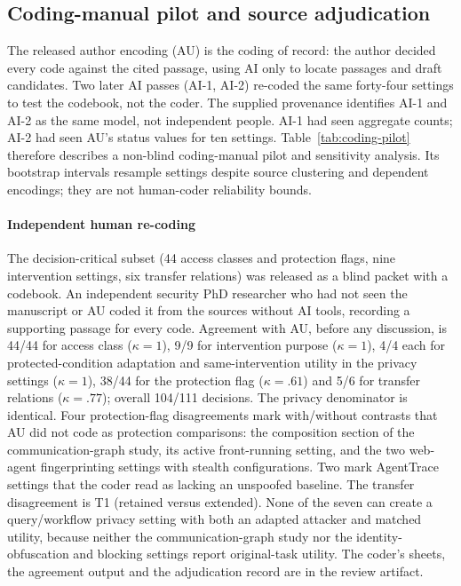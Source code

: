 \subsection{Coding-manual pilot and source adjudication}\label{supp:coding-pilot}
The released author encoding (AU) is the coding of record: the author decided every code against the cited passage, using AI only to locate passages and draft candidates. Two later AI passes (AI-1, AI-2) re-coded the same forty-four settings to test the codebook, not the coder. The supplied provenance identifies AI-1 and AI-2 as the same model, not independent people. AI-1 had seen aggregate counts; AI-2 had seen AU's status values for ten settings. Table~\ref{tab:coding-pilot} therefore describes a non-blind coding-manual pilot and sensitivity analysis. Its bootstrap intervals resample settings despite source clustering and dependent encodings; they are not human-coder reliability bounds. \paragraph{Independent human re-coding} The decision-critical subset (44 access classes and protection flags, nine intervention settings, six transfer relations) was released as a blind packet with a codebook. An independent security PhD researcher who had not seen the manuscript or AU coded it from the sources without AI tools, recording a supporting passage for every code. Agreement with AU, before any discussion, is 44/44 for access class ($\kappa=1$), 9/9 for intervention purpose ($\kappa=1$), 4/4 each for protected-condition adaptation and same-intervention utility in the privacy settings ($\kappa=1$), 38/44 for the protection flag ($\kappa=.61$) and 5/6 for transfer relations ($\kappa=.77$); overall 104/111 decisions. The privacy denominator is identical. Four protection-flag disagreements mark with/without contrasts that AU did not code as protection comparisons: the composition section of the communication-graph study, its active front-running setting, and the two web-agent fingerprinting settings with stealth configurations. Two mark AgentTrace settings that the coder read as lacking an unspoofed baseline. The transfer disagreement is T1 (retained versus extended). None of the seven can create a query/workflow privacy setting with both an adapted attacker and matched utility, because neither the communication-graph study nor the identity-obfuscation and blocking settings report original-task utility. The coder's sheets, the agreement output and the adjudication record are in the review artifact.

